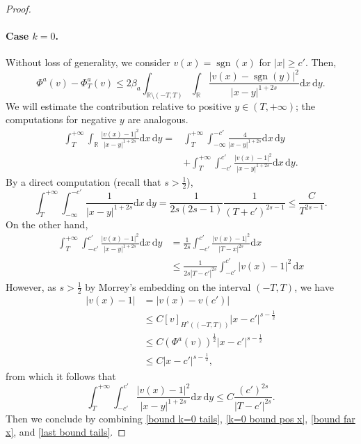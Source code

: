 \documentclass{article}
\theoremstyle{definition}
\newcommand{\de}{\mathrm{d}}
\newcommand{\R}{\mathbb{R}}
\newcommand{\sgn}{\operatorname{sgn}}
\begin{document}
\begin{proof}
\paragraph{Case $k=0$.} Without loss of generality, we consider $v(x)= \sgn(x)$ for $|x|\geq c'$. Then,
\begin{equation}
\label{bound k=0 tails}
    \Phi^a(v ) -\Phi^a_T(v )
    \leq  2\beta_a\int_{\R\setminus(-T,T)}\int_{\R}\frac{| v(x)-\sgn(y)|^2}{|x-y|^{1+2s}}\de x\,\de y.
\end{equation}
We will estimate the contribution relative to positive $y\in (T,+\infty)$; the computations for negative $y$ are analogous.
\begin{equation}
\label{k=0 bound pos x}
    \begin{split}
\int_{T}^{+\infty}\int_{\R}\frac{| v(x)-1|^2}{|x-y|^{1+2s}}\de x\,\de y = 
&\int_{T}^{+\infty}\int_{-\infty}^{-c'}\frac{4}{|x-y|^{1+2s}}\de x\,\de y \\
&+\int_{T}^{+\infty}\int_{-c'}^{c'}\frac{| v(x)-1|^2}{|x-y|^{1+2s}}\de x\,\de y.
\end{split}
\end{equation}
By a direct computation (recall that $s>\frac{1}{2}$),
\begin{equation}
\label{bound far x}
    \int_{T}^{+\infty}\int_{-\infty}^{-c'}\frac{1}{|x-y|^{1+2s}}\de x\,\de y = \frac{1}{2s(2s-1)}\frac{1}{(T+c')^{2s-1}}\leq \frac{C}{T^{2s-1}}.
\end{equation}
On the other hand, 
\[
\begin{split}
    \int_{T}^{+\infty}\int_{-c'}^{c'}\frac{| v(x)-1|^2}{|x-y|^{1+2s}}\de x\,\de y &= \frac{1}{2s}\int_{-c'}^{c'}\frac{| v(x)-1|^2}{|T-x|^{2s}}\de x\\
    &\leq \frac{1}{2s|T-c'|^{2s}}\int_{-c'}^{c'}|v(x)-1|^2
    \,\de x
    \end{split}
\]
However, as $s>\frac{1}{2}$ by Morrey's embedding on the interval $(-T,T)$, we have
\begin{align*}
    |v(x)-1|&=|v(x)-v(c')|\\
    &\leq C [v]_{H^s((-T,T))}|x-c'|^{s-\frac{1}{2}}\\
    &\leq C (\Phi^a(v))^\frac{1}{2} |x-c'|^{s-\frac{1}{2}}\\
    &\leq C |x-c'|^{s-\frac{1}{2}},
\end{align*}
from which it follows that 
\begin{equation}
\label{last bound tails}
    \int_{T}^{+\infty}\int_{-c'}^{c'}\frac{| v(x)-1|^2}{|x-y|^{1+2s}}\de x\,\de y \leq C\frac{(c')^{2s}}{|T-c'|^{2s}}.
\end{equation}
Then we conclude by combining \eqref{bound k=0 tails}, \eqref{k=0 bound pos x}, \eqref{bound far x}, and \eqref{last bound tails}.



\end{proof}
\end{document}
